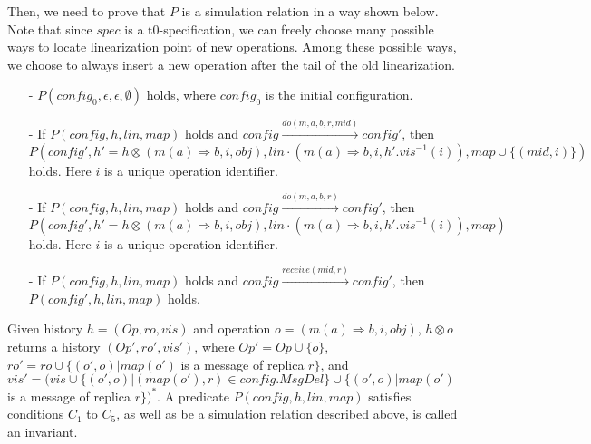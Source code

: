 Then, we need to prove that $P$ is a simulation relation in a way shown below. Note that since $\mathit{spec}$ is a t0-specification, we can freely choose many possible ways to locate linearization point of new operations. Among these possible ways, we choose to always insert a new operation after the tail of the old linearization. 

\begin{itemize}
\setlength{\itemsep}{0.5pt}
\item[-] $P(\mathit{config}_0,\epsilon,\epsilon,\emptyset)$ holds, where $\mathit{config}_0$ is the initial configuration. 

\item[-] If $P(\mathit{config},h,\mathit{lin},\mathit{map})$ holds and $\mathit{config} {\xrightarrow{\mathit{do}(m,a,b,r,\mathit{mid})}} \mathit{config}'$, then $P(\mathit{config}', h' = h \otimes (m(a) \Rightarrow b,i,\mathit{obj}), \mathit{lin} \cdot (m(a) \Rightarrow b,i,h'.\mathit{vis}^{-1}(i)),\mathit{map} \cup \{ (\mathit{mid}, i) \})$ holds. Here $i$ is a unique operation identifier.

\item[-] If $P(\mathit{config},h,\mathit{lin},\mathit{map})$ holds and $\mathit{config} {\xrightarrow{\mathit{do}(m,a,b,r)}} \mathit{config}'$, then $P(\mathit{config}',h' = h \otimes (m(a) \Rightarrow b,i,\mathit{obj}), \mathit{lin} \cdot (m(a) \Rightarrow b,i,h'.\mathit{vis}^{-1}(i)),\mathit{map})$ holds. Here $i$ is a unique operation identifier. 

\item[-] If $P(\mathit{config},h,\mathit{lin},\mathit{map})$ holds and $\mathit{config} {\xrightarrow{\mathit{receive}(\mathit{mid},r)}} \mathit{config}'$, then $P(\mathit{config}',h,\mathit{lin},\mathit{map})$ holds.
\end{itemize}

Given history $h = (\mathit{Op},\mathit{ro},\mathit{vis})$ and operation $o = (m(a) \Rightarrow b,i,\mathit{obj})$, $h \otimes o$ returns a history $(\mathit{Op}',\mathit{ro}',\mathit{vis}')$, where $\mathit{Op}' = \mathit{Op} \cup \{ o \}$, $\mathit{ro}' = \mathit{ro} \cup \{ (o',o) \vert \mathit{map}(o')$ is a message of replica $r \}$, and $\mathit{vis}' = (\mathit{vis} \cup \{ (o',o) \vert (\mathit{map}(o'),r) \in \mathit{config}.\mathit{MsgDel} \} \cup \{ (o',o) \vert \mathit{map}(o')$ is a message of replica $r \})^*$. A predicate $P(\mathit{config},h,\mathit{lin},\mathit{map})$ satisfies conditions $C_1$ to $C_5$, as well as be a simulation relation described above, is called an invariant.

